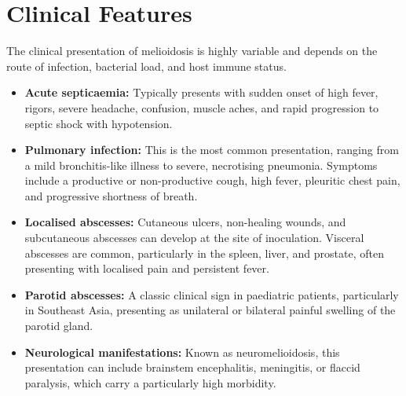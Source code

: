 \section*{Clinical Features}
The clinical presentation of melioidosis is highly variable and depends on the route of infection, bacterial load, and host immune status.
\begin{itemize}
    \item \textbf{Acute septicaemia:} Typically presents with sudden onset of high fever, rigors, severe headache, confusion, muscle aches, and rapid progression to septic shock with hypotension.
    \item \textbf{Pulmonary infection:} This is the most common presentation, ranging from a mild bronchitis-like illness to severe, necrotising pneumonia. Symptoms include a productive or non-productive cough, high fever, pleuritic chest pain, and progressive shortness of breath.
    \item \textbf{Localised abscesses:} Cutaneous ulcers, non-healing wounds, and subcutaneous abscesses can develop at the site of inoculation. Visceral abscesses are common, particularly in the spleen, liver, and prostate, often presenting with localised pain and persistent fever.
    \item \textbf{Parotid abscesses:} A classic clinical sign in paediatric patients, particularly in Southeast Asia, presenting as unilateral or bilateral painful swelling of the parotid gland.
    \item \textbf{Neurological manifestations:} Known as neuromelioidosis, this presentation can include brainstem encephalitis, meningitis, or flaccid paralysis, which carry a particularly high morbidity.
\end{itemize}

